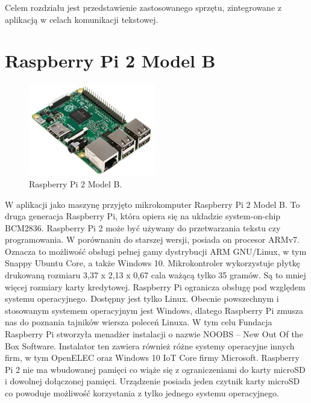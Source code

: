 Celem rozdziału jest przedstawienie zastosowanego sprzętu, zintegrowane z aplikacją w celach komunikacji tekstowej.
\section{Raspberry Pi 2 Model B} 
\begin{figure}[htbp]
	\centering
	\includegraphics[width=0.7\linewidth]{"obrazy/Raspberry Pi"}
	\caption{Raspberry Pi 2 Model B.}
	\label{fig:1}
\end{figure}
W aplikacji jako maszynę przyjęto mikrokomputer Raspberry Pi 2 Model B. To druga generacja Raspberry Pi, która opiera się na układzie system-on-chip BCM2836. Raspberry Pi 2 może być używany do przetwarzania tekstu czy programowania. W porównaniu do starszej wersji, posiada on procesor ARMv7. Oznacza to możliwość obsługi pełnej gamy dystrybucji ARM GNU/Linux,  w tym Snappy Ubuntu Core, a także Windows 10. Mikrokontroler wykorzystuje płytkę drukowaną rozmiaru 3,37 x 2,13 x 0,67 cala ważącą tylko 35 gramów. Są to mniej więcej rozmiary karty kredytowej. Raspberry Pi ogranicza obsługę pod względem systemu operacyjnego. Dostępny jest tylko Linux. Obecnie powszechnym i stosowanym systemem operacyjnym jest Windows, dlatego Raspberry Pi zmusza nas do poznania tajników wiersza poleceń Linuxa. W tym celu Fundacja Raspberry Pi stworzyła menadżer instalacji o nazwie NOOBS – New Out Of the Box Software. Instalator ten zawiera również różne systemy operacyjne innych firm, w tym OpenELEC oraz Windows 10 IoT Core firmy Microsoft. Raspberry Pi 2 nie ma wbudowanej pamięci co wiąże się z ograniczeniami do karty microSD i dowolnej dołączonej pamięci. Urządzenie posiada jeden czytnik karty microSD co powoduje możliwość korzystania z tylko jednego systemu operacyjnego.

